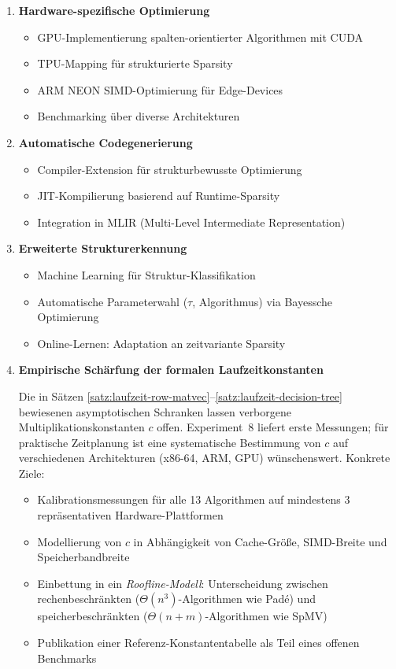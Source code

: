\documentclass[a4paper,12pt]{report}
\theoremstyle{definition}
\begin{document}
	\begin{enumerate}
		\item \textbf{Hardware-spezifische Optimierung}
		\begin{itemize}
			\item GPU-Implementierung spalten-orientierter Algorithmen mit CUDA
			\item TPU-Mapping für strukturierte Sparsity
			\item ARM NEON SIMD-Optimierung für Edge-Devices
			\item Benchmarking über diverse Architekturen
		\end{itemize}
		
		\item \textbf{Automatische Codegenerierung}
		\begin{itemize}
			\item Compiler-Extension für strukturbewusste Optimierung
			\item JIT-Kompilierung basierend auf Runtime-Sparsity
			\item Integration in MLIR (Multi-Level Intermediate Representation)
		\end{itemize}
		
		\item \textbf{Erweiterte Strukturerkennung}
		\begin{itemize}
			\item Machine Learning für Struktur-Klassifikation
			\item Automatische Parameterwahl ($\tau$, Algorithmus) via Bayessche Optimierung
			\item Online-Lernen: Adaptation an zeitvariante Sparsity
		\end{itemize}

		\item \textbf{Empirische Schärfung der formalen Laufzeitkonstanten}

		Die in Sätzen \ref{satz:laufzeit-row-matvec}--\ref{satz:laufzeit-decision-tree} bewiesenen asymptotischen Schranken lassen verborgene Multiplikationskonstanten $c$ offen. Experiment~8 liefert erste Messungen; für praktische Zeitplanung ist eine systematische Bestimmung von $c$ auf verschiedenen Architekturen (x86-64, ARM, GPU) wünschenswert. Konkrete Ziele:
		\begin{itemize}
			\item Kalibrationsmessungen für alle 13 Algorithmen auf mindestens 3 repräsentativen Hardware-Plattformen
			\item Modellierung von $c$ in Abhängigkeit von Cache-Größe, SIMD-Breite und Speicherbandbreite
			\item Einbettung in ein \emph{Roofline-Modell}: Unterscheidung zwischen rechenbeschränkten ($\Theta(n^3)$-Algorithmen wie Padé) und speicherbeschränkten ($\Theta(n+m)$-Algorithmen wie SpMV)
			\item Publikation einer Referenz-Konstantentabelle als Teil eines offenen Benchmarks
		\end{itemize}
	\end{enumerate}
	
\end{document}
